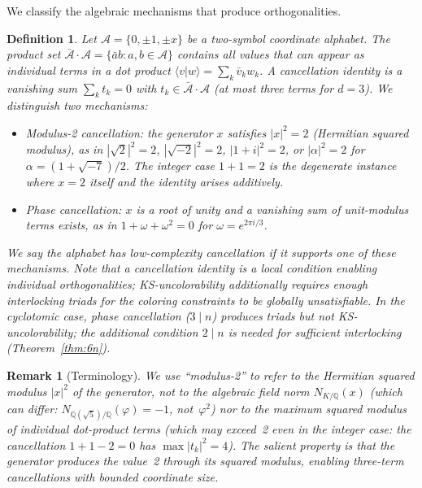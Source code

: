 \documentclass[12pt,a4paper]{article}
\newtheorem{definition}[theorem]{Definition}
\newtheorem{remark}[theorem]{Remark}
\newcommand{\Q}{\mathbb{Q}}
\begin{document}
We classify the algebraic mechanisms that produce orthogonalities.

\begin{definition}\label{def:cancellation}
Let $\mathcal{A} = \{0, \pm 1, \pm x\}$ be a two-symbol coordinate alphabet.  The \emph{product set} $\bar{\mathcal{A}} \cdot \mathcal{A} = \{\bar{a}b : a, b \in \mathcal{A}\}$ contains all values that can appear as individual terms in a dot product $\langle v | w \rangle = \sum_k \bar{v}_k w_k$.  A \emph{cancellation identity} is a vanishing sum $\sum_{k} t_k = 0$ with $t_k \in \bar{\mathcal{A}} \cdot \mathcal{A}$ (at most three terms for $d = 3$).  We distinguish two mechanisms:
\begin{itemize}
\item \emph{Modulus-2 cancellation}: the generator $x$ satisfies $|x|^2 = 2$ (Hermitian squared modulus), as in $|\sqrt{2}|^2 = 2$, $|\sqrt{-2}|^2 = 2$, $|1+i|^2 = 2$, or $|\alpha|^2 = 2$ for $\alpha = (1+\sqrt{-7})/2$.  The integer case $1+1=2$ is the degenerate instance where $x = 2$ itself and the identity arises additively.
\item \emph{Phase cancellation}: $x$ is a root of unity and a vanishing sum of unit-modulus terms exists, as in $1 + \omega + \omega^2 = 0$ for $\omega = e^{2\pi i/3}$.
\end{itemize}
We say the alphabet has \emph{low-complexity cancellation} if it supports one of these mechanisms.  Note that a cancellation identity is a \emph{local} condition enabling individual orthogonalities; KS-uncolorability additionally requires enough interlocking triads for the coloring constraints to be globally unsatisfiable.  In the cyclotomic case, phase cancellation ($3 \mid n$) produces triads but not KS-uncolorability; the additional condition $2 \mid n$ is needed for sufficient interlocking (Theorem~\ref{thm:6n}).
\end{definition}

\begin{remark}[Terminology]\label{rem:norm-clarification}
We use ``modulus-2'' to refer to the Hermitian squared modulus $|x|^2$ of the generator, \emph{not} to the algebraic field norm $N_{K/\Q}(x)$ (which can differ: $N_{\Q(\sqrt{5})/\Q}(\varphi) = -1$, not~$\varphi^2$) nor to the maximum squared modulus of individual dot-product terms (which may exceed~2 even in the integer case: the cancellation $1 + 1 - 2 = 0$ has $\max|t_k|^2 = 4$).  The salient property is that the generator produces the value~2 through its squared modulus, enabling three-term cancellations with bounded coordinate size.
\end{remark}
\end{document}
